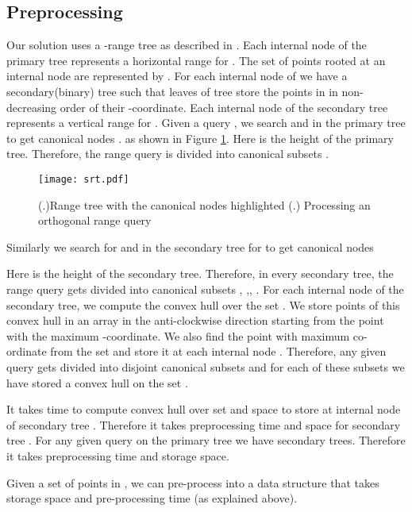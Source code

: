 \documentclass[runningheads,a4paper]{llncs}
\begin{document}
\subsection{Preprocessing}\label{preprocessing}
Our solution uses a -range tree as described in \cite{berg}.  Each
internal node of the primary tree  represents a horizontal range
 for .  The set of points rooted at an internal node
 are represented by . For each internal node  of  we have a
secondary(binary) tree  such that leaves of tree  store
the points in  in non-decreasing order of their -coordinate.  Each
internal node of the secondary tree  represents a vertical range
 for .  Given a query , we search  and  in the primary tree to get canonical nodes
.
as shown in Figure \ref{fig3}. Here  is the height of the primary
tree. Therefore, the range query  is divided into  canonical subsets .
\begin{figure}
\vspace{-0.7cm}
\centering
\texttt{[image: srt.pdf]}
\caption{(.)Range tree with the canonical nodes highlighted (.) Processing an orthogonal range query}
\label{fig3}
\vspace{-0.7cm}
\end{figure}
Similarly we search for  and  in the secondary tree
 for  to get canonical nodes

Here  is the height of the secondary
tree. Therefore, in every secondary tree, the range query  gets
divided into  canonical subsets , ,, .
For each internal node  of the secondary tree, we compute the convex hull over the set .
We store points of this convex hull in an array 
in the anti-clockwise direction starting from the point with the maximum -coordinate. 
We also find the point  with maximum  co-ordinate from the set  and store it at each internal node .
Therefore, any given query  gets divided into  disjoint canonical subsets and 
for each of these subsets we have stored a convex hull  on the set .

It takes  time to compute convex hull  over set
 and  space to store  at internal node  of
secondary tree . Therefore it takes
 preprocessing time and
 space for secondary tree . For any given query
 on the primary tree  we have  secondary
trees. Therefore it takes  preprocessing time
and  storage space.

\begin{lemma}\label{lem1}
  Given a set  of  points in , we can pre-process 
  into a data structure that takes  storage space and  pre-processing time (as explained above).
\end{lemma}
\end{document}
